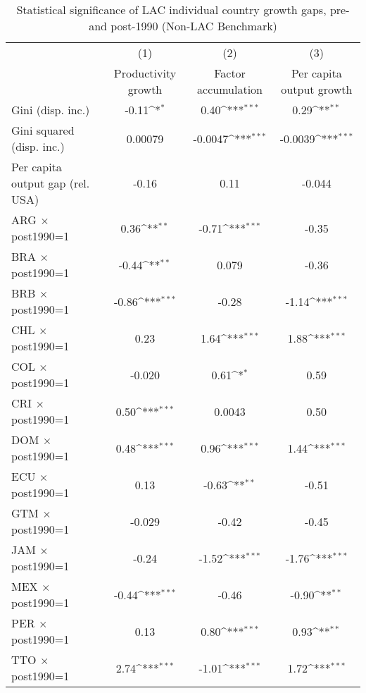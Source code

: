 \begin{sidewaystable}[htbp]\centering
\def\sym#1{\ifmmode^{#1}\else\(^{#1}\)\fi}
\caption{Statistical significance of LAC individual country growth gaps, pre- and post-1990 (Non-LAC Benchmark)}
\begin{tabular}{l*{3}{c}}
\toprule
                &\multicolumn{1}{c}{(1)}&\multicolumn{1}{c}{(2)}&\multicolumn{1}{c}{(3)}\\
                &\multicolumn{1}{c}{Productivity growth}&\multicolumn{1}{c}{Factor accumulation}&\multicolumn{1}{c}{Per capita output growth}\\
\midrule
Gini (disp. inc.)&    -0.11\sym{*}  &     0.40\sym{***}&     0.29\sym{**} \\
Gini squared (disp. inc.)&  0.00079         &  -0.0047\sym{***}&  -0.0039\sym{***}\\
Per capita output gap (rel. USA)&    -0.16         &     0.11         &   -0.044         \\
ARG $\times$ post1990=1&     0.36\sym{**} &    -0.71\sym{***}&    -0.35         \\
BRA $\times$ post1990=1&    -0.44\sym{**} &    0.079         &    -0.36         \\
BRB $\times$ post1990=1&    -0.86\sym{***}&    -0.28         &    -1.14\sym{***}\\
CHL $\times$ post1990=1&     0.23         &     1.64\sym{***}&     1.88\sym{***}\\
COL $\times$ post1990=1&   -0.020         &     0.61\sym{*}  &     0.59         \\
CRI $\times$ post1990=1&     0.50\sym{***}&   0.0043         &     0.50         \\
DOM $\times$ post1990=1&     0.48\sym{***}&     0.96\sym{***}&     1.44\sym{***}\\
ECU $\times$ post1990=1&     0.13         &    -0.63\sym{**} &    -0.51         \\
GTM $\times$ post1990=1&   -0.029         &    -0.42         &    -0.45         \\
JAM $\times$ post1990=1&    -0.24         &    -1.52\sym{***}&    -1.76\sym{***}\\
MEX $\times$ post1990=1&    -0.44\sym{***}&    -0.46         &    -0.90\sym{**} \\
PER $\times$ post1990=1&     0.13         &     0.80\sym{***}&     0.93\sym{**} \\
TTO $\times$ post1990=1&     2.74\sym{***}&    -1.01\sym{***}&     1.72\sym{***}\\

\end{tabular}
\end{sidewaystable}
